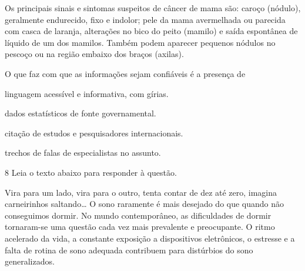 \begin{myquote}
Os principais sinais e sintomas suspeitos de câncer de mama são: caroço
(nódulo), geralmente endurecido, fixo e indolor; pele da mama avermelhada ou
parecida com casca de laranja, alterações no bico do peito (mamilo) e saída
espontânea de líquido de um dos mamilos. Também podem aparecer pequenos
nódulos no pescoço ou na região embaixo dos braços (axilas).


\end{myquote}

O que faz com que as informações sejam confiáveis é a presença de

\begin{escolha}
    
    \item linguagem acessível e informativa, com gírias.
    
    \item dados estatísticos de fonte governamental.

    \item citação de estudos e pesquisadores internacionais.
    
    \item trechos de falas de especialistas no assunto.

\end{escolha}

\num{8} Leia o texto abaixo para responder à questão. 

\begin{myquote}



Vira para um lado, vira para o outro, tenta contar de dez até zero, 
imagina carneirinhos saltando\ldots{} O sono raramente é mais desejado 
do que quando não conseguimos dormir. No mundo contemporâneo, as dificuldades
de dormir tornaram-se uma questão cada vez mais prevalente e preocupante. 
O ritmo acelerado da vida, a constante exposição a dispositivos eletrônicos, 
o estresse e a falta de rotina de sono adequada contribuem para distúrbios do sono
generalizados.




\end{myquote}

